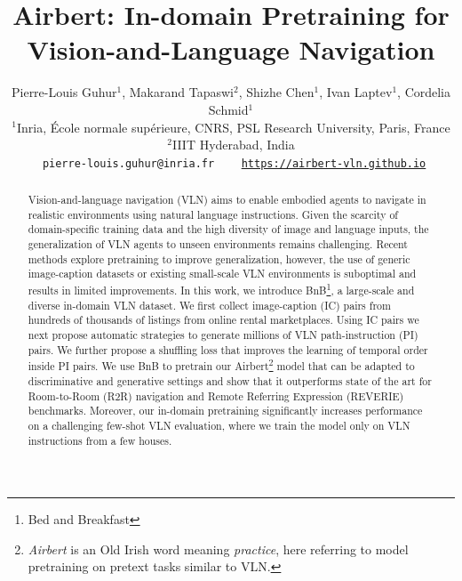 \RequirePackage[dvipsnames,table]{xcolor} \documentclass[10pt,twocolumn,letterpaper]{article}
\newcommand{\airbert}{Airbert}
\newcommand{\airbnb}{BnB}
\begin{document}
\title{Airbert: In-domain Pretraining for Vision-and-Language Navigation}


\author{Pierre-Louis Guhur$^{1}$,
Makarand Tapaswi$^{2}$,
Shizhe Chen$^{1}$,
Ivan Laptev$^{1}$,
Cordelia Schmid$^{1}$\\
$^{1}$Inria, \'Ecole normale sup\'erieure, CNRS, PSL Research University, Paris, France\\
$^{2}$IIIT Hyderabad, India\\
{\tt\small  \email~pierre-louis.guhur@inria.fr}  ~~
{\tt\small \website~\url{https://airbert-vln.github.io}}
}


\maketitle
\ificcvfinal\thispagestyle{empty}\fi



\begin{abstract}
Vision-and-language navigation (VLN) aims to enable embodied agents to navigate in realistic environments using natural language instructions.
Given the scarcity of domain-specific training data and the high diversity of image and language inputs, the generalization of VLN agents to unseen environments remains challenging.
Recent methods explore pretraining to improve generalization, however, the use of generic image-caption datasets or existing small-scale VLN environments 
is suboptimal and results in limited improvements.
In this work, we introduce \airbnb\footnote{Bed and Breakfast}, a large-scale and diverse in-domain VLN dataset. 
We first collect image-caption (IC) pairs from hundreds of thousands of listings from online rental marketplaces.
Using IC pairs we next propose automatic strategies to generate millions of VLN path-instruction (PI) pairs.
We further propose a shuffling loss that improves the learning of temporal order inside PI pairs.
We use \airbnb{} to pretrain our \airbert\footnote{
\emph{\airbert} is an Old Irish word meaning \emph{practice}, here referring to model pretraining on pretext tasks similar to VLN.}
model that can be adapted to discriminative and generative settings and show that it outperforms state of the art for Room-to-Room (R2R) navigation and Remote Referring Expression (REVERIE) benchmarks.
Moreover, our in-domain pretraining significantly increases performance on a challenging few-shot VLN evaluation, where we train the model only on VLN instructions from a few houses.
\end{abstract}
\end{document}
